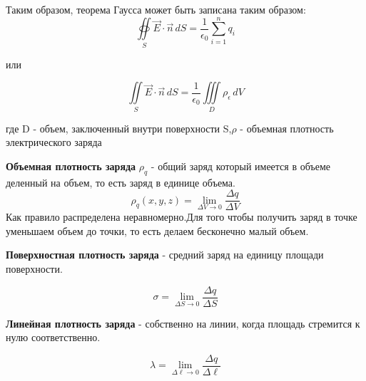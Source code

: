 \documentclass[../main.tex]{subfiles}
\begin{document}
Таким образом, теорема Гаусса может быть записана таким образом:
\[ \oiint\limits_S \vec E \cdot \vec n \,  dS = \frac{1}{\epsilon_0} \sum_{i=1}^{n} q_i\]
\begin{center}
    или
\end{center}
\[\iint \limits_S \vec E \cdot \vec n \, dS  = \frac{1}{\epsilon_0} \iiint\limits_D \rho_\epsilon \, dV\]
\begin{center}
    где D - объем, заключенный внутри поверхности S,\linebreak $\rho$ - объемная плотность электрического заряда
\end{center}


 \textbf{Объемная плотность заряда} $\rho_q$ - общий заряд который имеется в объеме деленный на объем, то есть заряд в единице объема.
\[ \rho_q(x,y,z) = \lim_{\Delta V \to 0} \frac{\Delta q}{\Delta V}\]
Как правило распределена неравномерно.Для того чтобы получить заряд в точке уменьшаем объем до точки, то есть делаем бесконечно малый объем.

 \textbf{Поверхностная плотность заряда} - средний заряд на единицу площади поверхности.

\[ \sigma = \lim_{\Delta S \to 0} \frac{\Delta q}{\Delta S}\]


 \textbf{Линейная плотность заряда}  - собственно на линии, когда площадь стремится к нулю соответственно.

\[ \lambda = \lim_{\Delta \ell \to 0} \frac{\Delta q}{\Delta \ell}\]
\end{document}
